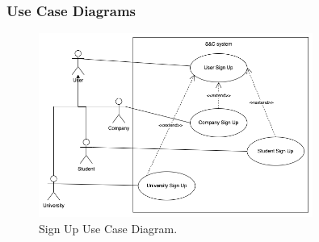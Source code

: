 


\subsubsection{Use Case Diagrams}

\begin{figure}[H]
\centering
\includegraphics[width=0.8\textwidth]{Images/SignUP_Use_Case_Diagram.png}
\caption{\label{fig:metamodel9}Sign Up Use Case Diagram.}
\end{figure}

